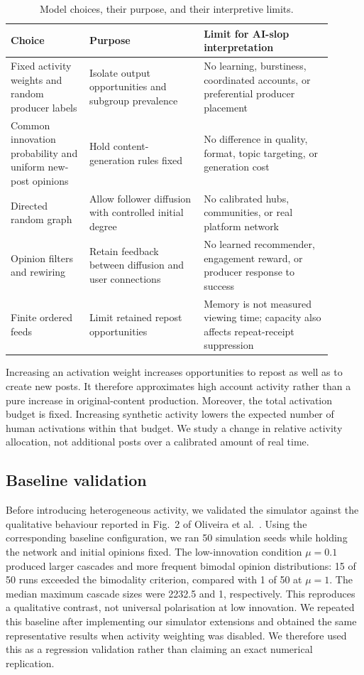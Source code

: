 \documentclass[runningheads]{llncs}
\begin{document}
\begin{table}[tb]
\caption{Model choices, their purpose, and their interpretive limits.}
\label{tab:assumptions}
\centering\small
\begin{tabular}{>{\raggedright\arraybackslash}p{0.22\linewidth}>{\raggedright\arraybackslash}p{0.32\linewidth}>{\raggedright\arraybackslash}p{0.36\linewidth}}
\hline
Choice & Purpose & Limit for AI-slop interpretation \\\hline
Fixed activity weights and random producer labels & Isolate output opportunities and subgroup prevalence & No learning, burstiness, coordinated accounts, or preferential producer placement \\[4pt]
Common innovation probability and uniform new-post opinions & Hold content-generation rules fixed & No difference in quality, format, topic targeting, or generation cost \\[4pt]
Directed random graph & Allow follower diffusion with controlled initial degree & No calibrated hubs, communities, or real platform network \\[4pt]
Opinion filters and rewiring & Retain feedback between diffusion and user connections & No learned recommender, engagement reward, or producer response to success \\[4pt]
Finite ordered feeds & Limit retained repost opportunities & Memory is not measured viewing time; capacity also affects repeat-receipt suppression \\\hline
\end{tabular}
\end{table}

Increasing an activation weight increases opportunities to repost as well as to create new posts. It therefore approximates high account activity rather than a pure increase in original-content production. Moreover, the total activation budget is fixed. Increasing synthetic activity lowers the expected number of human activations within that budget. We study a change in relative activity allocation, not additional posts over a calibrated amount of real time.

\subsection{Baseline validation}

Before introducing heterogeneous activity, we validated the simulator against the qualitative behaviour reported in Fig.~2 of Oliveira et al.~\cite{oliveira2026}. Using the corresponding baseline configuration, we ran 50 simulation seeds while holding the network and initial opinions fixed. The low-innovation condition \(\mu=0.1\) produced larger cascades and more frequent bimodal opinion distributions: 15 of 50 runs exceeded the bimodality criterion, compared with 1 of 50 at \(\mu=1\). The median maximum cascade sizes were 2232.5 and 1, respectively. This reproduces a qualitative contrast, not universal polarisation at low innovation. We repeated this baseline after implementing our simulator extensions and obtained the same representative results when activity weighting was disabled. We therefore used this as a regression validation rather than claiming an exact numerical replication.
\end{document}

